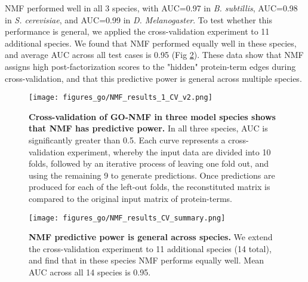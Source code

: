 \documentclass[12pt,a4paper]{report}
\begin{document}
NMF performed well in all 3 species, with AUC=0.97 in \textit{B. subtillis}, AUC=0.98 in \textit{S. cerevisiae}, and AUC=0.99 in \textit{D. Melanogaster}. To test whether this performance is general, we applied the cross-validation experiment to 11 additional species. We found that NMF performed equally well in these species, and average AUC across all test cases is 0.95 (Fig \ref{fig:nmf_cv_summary}). These data show that NMF assigns high post-factorization scores to the "hidden" protein-term edges during cross-validation, and that this predictive power is general across multiple species.


\begin{figure}
\vspace*{-3.5in}
\begin{minipage}[c][\textheight]{\textwidth}
  \texttt{[image: figures\_go/NMF\_results\_1\_CV\_v2.png]}
  \caption[Cross-validation of GO-NMF in three model species.]{\textbf{Cross-validation of GO-NMF in three model species shows that NMF has predictive power.} In all three species, AUC is significantly greater than 0.5. Each curve represents a cross-validation experiment, whereby the input data are divided into 10 folds, followed by an iterative process of leaving one fold out, and using the remaining 9 to generate predictions. Once predictions are produced for each of the left-out folds, the reconstituted matrix is compared to the original input matrix of protein-terms.}
  \label{fig:nmf_cv_3_models}
 \end{minipage}
\end{figure}

\begin{figure}
\vspace*{-3in}
\begin{minipage}[c][\textheight]{\textwidth}
\centering
  \texttt{[image: figures\_go/NMF\_results\_CV\_summary.png]}
  \caption[NMF predictive power is general across species.]{\textbf{NMF predictive power is general across species.} We extend the cross-validation experiment to 11 additional species (14 total), and find that in these species NMF performs equally well. Mean AUC across all 14 species is 0.95.}
  \label{fig:nmf_cv_summary}
  \end{minipage}
\end{figure}
\end{document}
